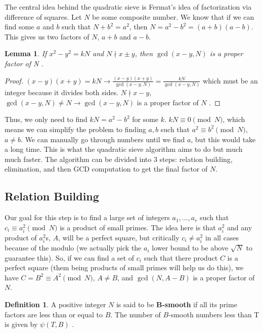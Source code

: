 \documentclass[11pt,reqno]{amsart}
\newtheorem{lemma}[theorem]{Lemma}
\theoremstyle{definition}
\newtheorem{definition}[theorem]{Definition}
\begin{document}
The central idea behind the quadratic sieve is Fermat's idea of factorization via difference of squares. Let $N$ be some composite number. We know that if we can find some $a$ and $b$ such that $N + b^2 = a^2$, then $N = a^2 - b^2 = (a+b)(a-b)$. This gives us two factors of $N$, $a+b$ and $a-b$. 

\begin{lemma}
   If $x^2 - y^2 = kN$ and $N \nmid x\pm y$, then $\gcd(x - y, N)$ is a proper factor of N \cite{silverman2008introduction}.
\end{lemma}

\begin{proof}
   $(x-y)(x+y) = kN \rightarrow \frac{(x-y)(x+y)}{\gcd(x-y, N)} = \frac{kN}{\gcd(x-y, N)}$ which must be an integer because it divides both sides. $N \nmid x - y$, $\gcd(x-y, N) \neq N \rightarrow \gcd(x-y, N)$ is a proper factor of $N$ \cite{silverman2008introduction}.
\end{proof}

Thus, we only need to find $kN = a^2-b^2$ for some $k$. $kN \equiv 0 \pmod{N}$, which means we can simplify the problem to finding $a, b$ such that $a^2 \equiv b^2 \pmod{N}$, $a \neq b$. We can manually go through numbers until we find $a$, but this would take a long time. This is what the quadratic sieve algorithm aims to do but much much faster. The algorithm can be divided into 3 steps: relation building, elimination, and then GCD computation to get the final factor of $N$.

\subsection{Relation Building}

Our goal for this step is to find a large set of integers $a_1,...,a_r$ such that $c_i \equiv a_i^2 \pmod{N}$ is a product of small primes. The idea here is that $a_i^2$ and any product of $a_i^2$s, $A$, will be a perfect square, but critically $c_i \neq a_i^2$ in all cases because of the modulo (we actually pick the $a_i$ lower bound to be above $\sqrt{N}$ to guarantee this). So, if we can find a set of $c_i$ such that there product $C$ is a perfect square (them being products of small primes will help us do this), we have $C = B^2 \equiv A^2 \pmod{N}$, $A \neq B$, and $\gcd(N, A-B)$ is a proper factor of $N$.

\begin{definition}
   A positive integer $N$ is said to be \textbf{B-smooth} if all its prime factors are less than or equal to $B$. The number of $B$-smooth numbers less than T is given by $\psi(T, B)$ \cite{silverman2008introduction}.
\end{definition}
\end{document}
